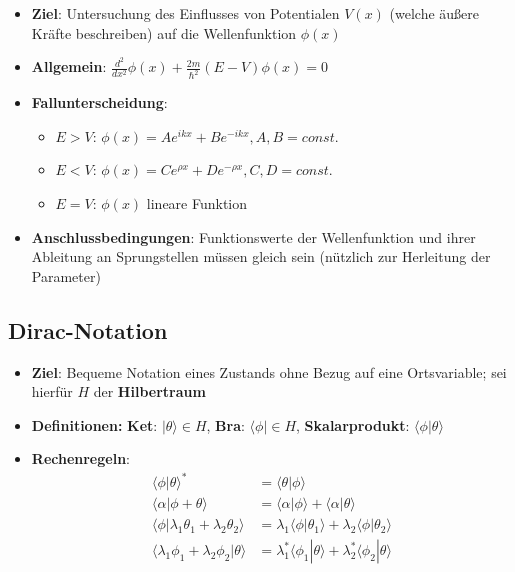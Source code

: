\begin{itemize}
	\item \textbf{Ziel}: Untersuchung des Einflusses von Potentialen $V(x)$ (welche äußere Kräfte beschreiben) auf die Wellenfunktion $\phi(x)$
	\item \textbf{Allgemein}: $\frac{d^2}{dx^2}\phi(x) + \frac{2m}{\hbar^2}(E - V)\phi(x) = 0$
	\item \textbf{Fallunterscheidung}:
	\begin{itemize}
		\item $E > V$: $\phi(x) = Ae^{ikx} + Be^{-ikx}, A, B = const.$
		\item $E < V$: $\phi(x) = Ce^{\rho x} + De^{-\rho x}, C, D = const.$
		\item $E = V$: $\phi(x)$ lineare Funktion
	\end{itemize}
	\item \textbf{Anschlussbedingungen}: Funktionswerte der Wellenfunktion und ihrer Ableitung an Sprungstellen müssen gleich sein (nützlich zur Herleitung der Parameter)
\end{itemize}

\subsection{Dirac-Notation}%
\label{quant:sub:dirac_notation}

\begin{itemize}
	\item \textbf{Ziel}: Bequeme Notation eines Zustands ohne Bezug auf eine Ortsvariable; sei hierfür $H$ der \textbf{Hilbertraum}
	\item \textbf{Definitionen: }\textbf{Ket}: $|\theta\rangle \in H$, \textbf{Bra}: $\langle\phi| \in H$, \textbf{Skalarprodukt}: $\langle \phi | \theta \rangle$
	\item \textbf{Rechenregeln}:
	\begin{align*}
		\langle \phi | \theta \rangle^* &= \langle \theta | \phi \rangle\\
		\langle \alpha | \phi + \theta \rangle &= \langle \alpha | \phi \rangle + \langle \alpha | \theta \rangle\\
		\langle \phi | \lambda_1\theta_1 + \lambda_2\theta_2 \rangle &= \lambda_1\langle \phi | \theta_1\rangle + \lambda_2\langle \phi |\theta_2 \rangle\\
		\langle \lambda_1\phi_1 + \lambda_2\phi_2 | \theta \rangle &= \lambda_1^*\langle \phi_1 | \theta\rangle + \lambda_2^*\langle \phi_2 |\theta \rangle\\
	\end{align*}
\end{itemize}

